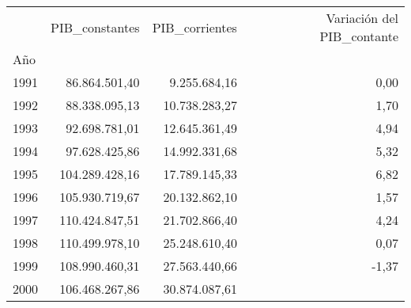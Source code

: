 \begin{tabular}{llll}
\cline{1-4}
\multicolumn{1}{c}{} &
  \multicolumn{1}{|r}{PIB\_constantes} &
  \multicolumn{1}{r}{PIB\_corrientes} &
  \multicolumn{1}{r}{Variación del PIB\_contante} \\
\cline{1-4}
\multicolumn{1}{l}{Año} &
  \multicolumn{1}{|r}{} &
  \multicolumn{1}{r}{} &
  \multicolumn{1}{r}{} \\
\multicolumn{1}{l}{\hspace{1em}1991} &
  \multicolumn{1}{|r}{86.864.501,40} &
  \multicolumn{1}{r}{9.255.684,16} &
  \multicolumn{1}{r}{0,00} \\
\multicolumn{1}{l}{\hspace{1em}1992} &
  \multicolumn{1}{|r}{88.338.095,13} &
  \multicolumn{1}{r}{10.738.283,27} &
  \multicolumn{1}{r}{1,70} \\
\multicolumn{1}{l}{\hspace{1em}1993} &
  \multicolumn{1}{|r}{92.698.781,01} &
  \multicolumn{1}{r}{12.645.361,49} &
  \multicolumn{1}{r}{4,94} \\
\multicolumn{1}{l}{\hspace{1em}1994} &
  \multicolumn{1}{|r}{97.628.425,86} &
  \multicolumn{1}{r}{14.992.331,68} &
  \multicolumn{1}{r}{5,32} \\
\multicolumn{1}{l}{\hspace{1em}1995} &
  \multicolumn{1}{|r}{104.289.428,16} &
  \multicolumn{1}{r}{17.789.145,33} &
  \multicolumn{1}{r}{6,82} \\
\multicolumn{1}{l}{\hspace{1em}1996} &
  \multicolumn{1}{|r}{105.930.719,67} &
  \multicolumn{1}{r}{20.132.862,10} &
  \multicolumn{1}{r}{1,57} \\
\multicolumn{1}{l}{\hspace{1em}1997} &
  \multicolumn{1}{|r}{110.424.847,51} &
  \multicolumn{1}{r}{21.702.866,40} &
  \multicolumn{1}{r}{4,24} \\
\multicolumn{1}{l}{\hspace{1em}1998} &
  \multicolumn{1}{|r}{110.499.978,10} &
  \multicolumn{1}{r}{25.248.610,40} &
  \multicolumn{1}{r}{0,07} \\
\multicolumn{1}{l}{\hspace{1em}1999} &
  \multicolumn{1}{|r}{108.990.460,31} &
  \multicolumn{1}{r}{27.563.440,66} &
  \multicolumn{1}{r}{-1,37} \\
\multicolumn{1}{l}{\hspace{1em}2000} &
  \multicolumn{1}{|r}{106.468.267,86} &
  \multicolumn{1}{r}{30.874.087,61} &

\end{tabular}
